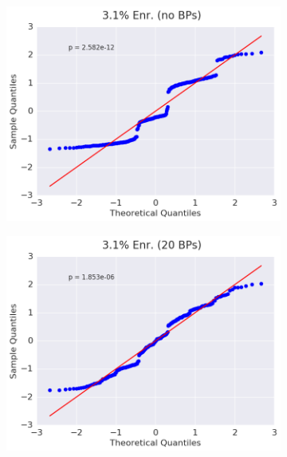 \begin{figure}[h!]
\centering
\begin{subfigure}{0.5\textwidth}
  \centering
  \includegraphics[width=\linewidth]{figures/patterns/assm-3.1/quantile/assm-31-capt-1}
  \caption{}
  \label{fig:chap9-qq-assm-3.1-capt}
\end{subfigure}%
\begin{subfigure}{0.5\textwidth}
  \centering
  \includegraphics[width=\linewidth]{figures/patterns/assm-3.1-20BPs/quantile/assm-31-20BPs-capt-1}
  \caption{}
  \label{fig:chap9-qq-assm-3.1-20BPs-capt}
\end{subfigure}
\begin{subfigure}{0.5\textwidth}

\end{subfigure}
\end{figure}
